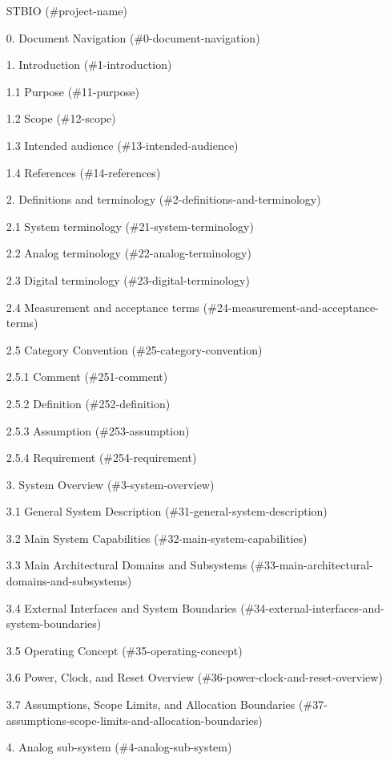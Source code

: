 \documentclass[11pt]{article}
\begin{document}
\begin{itemize}
\item [STBIO](\#project-name)
\item [0. Document Navigation](\#0-document-navigation)
\item [1. Introduction](\#1-introduction)
\item [1.1 Purpose](\#11-purpose)
\item [1.2 Scope](\#12-scope)
\item [1.3 Intended audience](\#13-intended-audience)
\item [1.4 References](\#14-references)
\item [2. Definitions and terminology](\#2-definitions-and-terminology)
\item [2.1 System terminology](\#21-system-terminology)
\item [2.2 Analog terminology](\#22-analog-terminology)
\item [2.3 Digital terminology](\#23-digital-terminology)
\item [2.4 Measurement and acceptance terms](\#24-measurement-and-acceptance-terms)
\item [2.5 Category Convention](\#25-category-convention)
\item [2.5.1 Comment](\#251-comment)
\item [2.5.2 Definition](\#252-definition)
\item [2.5.3 Assumption](\#253-assumption)
\item [2.5.4 Requirement](\#254-requirement)
\item [3. System Overview](\#3-system-overview)
\item [3.1 General System Description](\#31-general-system-description)
\item [3.2 Main System Capabilities](\#32-main-system-capabilities)
\item [3.3 Main Architectural Domains and Subsystems](\#33-main-architectural-domains-and-subsystems)
\item [3.4 External Interfaces and System Boundaries](\#34-external-interfaces-and-system-boundaries)
\item [3.5 Operating Concept](\#35-operating-concept)
\item [3.6 Power, Clock, and Reset Overview](\#36-power-clock-and-reset-overview)
\item [3.7 Assumptions, Scope Limits, and Allocation Boundaries](\#37-assumptions-scope-limits-and-allocation-boundaries)
\item [4. Analog sub-system](\#4-analog-sub-system)

\end{itemize}
\end{document}
